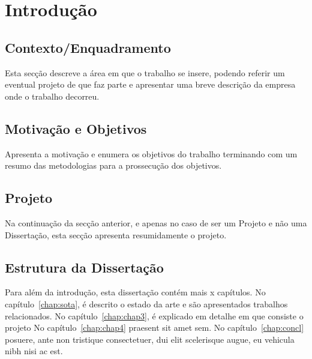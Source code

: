 
\chapter{Introdução} \label{chap:intro}

\section*{}

\lipsum

\section{Contexto/Enquadramento} \label{sec:context}

Esta secção descreve a área em que o trabalho se insere, podendo
referir um eventual projeto de que faz parte e apresentar uma breve
descrição da empresa onde o trabalho decorreu.

\lipsum[1]
\lipsum[1]

\section{Motivação e Objetivos} \label{sec:goals}

Apresenta a motivação e enumera os objetivos do trabalho terminando
com um resumo das metodologias para a prossecução dos objetivos.

\lipsum[1]
\lipsum[1]

\section{Projeto} \label{sec:proj}

Na continuação da secção anterior, e apenas no caso de ser um Projeto
e não uma Dissertação, esta secção apresenta resumidamente o projeto.

\lipsum[1]
\lipsum[1]

\section{Estrutura da Dissertação} \label{sec:struct}

Para além da introdução, esta dissertação contém mais x capítulos.
No capítulo~\ref{chap:sota}, é descrito o estado da arte e são
apresentados trabalhos relacionados. 
No capítulo~\ref{chap:chap3}, é explicado em detalhe em que consiste o projeto
No capítulo~\ref{chap:chap4} praesent sit amet sem. 
No capítulo~\ref{chap:concl}  posuere, ante non tristique
consectetuer, dui elit scelerisque augue, eu vehicula nibh nisi ac
est. 
